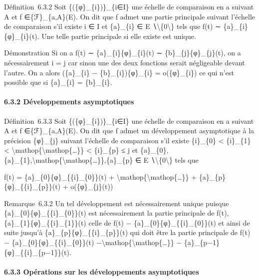 \documentclass[]{article}
\begin{document}
Définition~6.3.2 Soit \{(\{φ\}\_\{i\})\}\_\{i∈I\} une échelle de
comparaison en a suivant A et f ∈\{ℱ\}\_\{a,A\}(E). On dit que f admet
une partie principale suivant l'échelle de comparaison s'il existe i ∈ I
et \{a\}\_\{i\} ∈ E ∖\textbackslash{}\{0\textbackslash{}\} tels que f(t)
∼ \{a\}\_\{i\}\{φ\}\_\{i\}(t). Une telle partie principale si elle
existe est unique.

Démonstration Si on a f(t) ∼ \{a\}\_\{i\}\{φ\}\_\{i\}(t) ∼
\{b\}\_\{j\}\{φ\}\_\{j\}(t), on a nécessairement i = j car sinon une des
deux fonctions serait négligeable devant l'autre. On a alors
(\{a\}\_\{i\} − \{b\}\_\{i\})\{φ\}\_\{i\} = o(\{φ\}\_\{i\}) ce qui n'est
possible que si \{a\}\_\{i\} = \{b\}\_\{i\}.

\paragraph{6.3.2 Développements asymptotiques}

Définition~6.3.3 Soit \{(\{φ\}\_\{i\})\}\_\{i∈I\} une échelle de
comparaison en a suivant A et f ∈\{ℱ\}\_\{a,A\}(E). On dit que f admet
un développement asymptotique à la précision \{φ\}\_\{j\} suivant
l'échelle de comparaison s'il existe \{i\}\_\{0\} \textless{}
\{i\}\_\{1\} \textless{}
\textbackslash{}mathop\{\textbackslash{}mathop\{\ldots{}\}\} \textless{}
\{i\}\_\{p\} ≤ j et
\{a\}\_\{0\},\{a\}\_\{1\},\textbackslash{}mathop\{\textbackslash{}mathop\{\ldots{}\}\},\{a\}\_\{p\}
∈ E ∖\textbackslash{}\{0\textbackslash{}\} tels que

f(t) = \{a\}\_\{0\}\{φ\}\_\{\{i\}\_\{0\}\}(t) +
\textbackslash{}mathop\{\textbackslash{}mathop\{\ldots{}\}\} +
\{a\}\_\{p\}\{φ\}\_\{\{i\}\_\{p\}\}(t) + o(\{φ\}\_\{j\}(t))

Remarque~6.3.2 Un tel développement est nécessairement unique puisque
\{a\}\_\{0\}\{φ\}\_\{\{i\}\_\{0\}\}(t) est nécessairement la partie
principale de f(t), \{a\}\_\{1\}\{φ\}\_\{\{i\}\_\{1\}\}(t) celle de f(t)
− \{a\}\_\{0\}\{φ\}\_\{\{i\}\_\{0\}\}(t) et ainsi de suite jusqu'à
\{a\}\_\{p\}\{φ\}\_\{\{i\}\_\{p\}\}(t) qui doit être la partie
principale de f(t) − \{a\}\_\{0\}\{φ\}\_\{\{i\}\_\{0\}\}(t)
−\textbackslash{}mathop\{\textbackslash{}mathop\{\ldots{}\}\} −
\{a\}\_\{p−1\}\{φ\}\_\{\{i\}\_\{p−1\}\}(t).

\paragraph{6.3.3 Opérations sur les développements asymptotiques}
\end{document}
